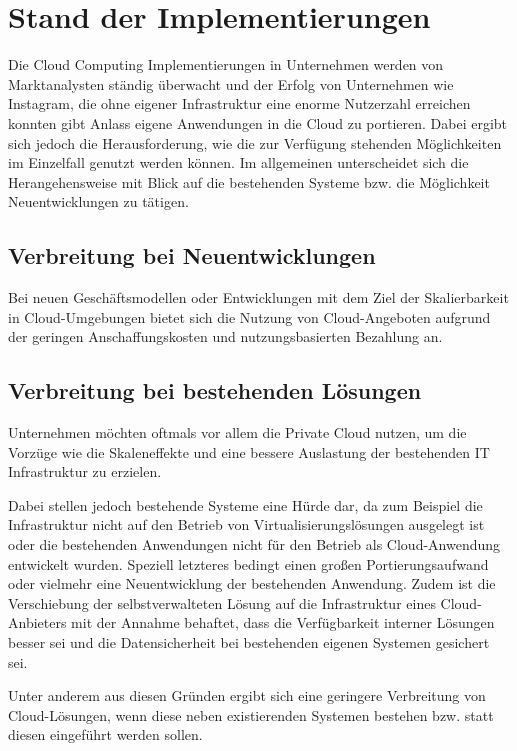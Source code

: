 \section{Stand der Implementierungen}
\label{sec_implementations}
Die Cloud Computing Implementierungen in Unternehmen werden von Marktanalysten ständig überwacht und der Erfolg von Unternehmen wie Instagram, die ohne eigener Infrastruktur eine enorme Nutzerzahl erreichen konnten gibt Anlass eigene Anwendungen in die Cloud zu portieren. Dabei ergibt sich jedoch die Herausforderung, wie die zur Verfügung stehenden Möglichkeiten im Einzelfall genutzt werden können. Im allgemeinen unterscheidet sich die Herangehensweise mit Blick auf die bestehenden Systeme bzw. die Möglichkeit Neuentwicklungen zu tätigen.

\subsection{Verbreitung bei Neuentwicklungen}
Bei neuen Geschäftsmodellen oder Entwicklungen mit dem Ziel der Skalierbarkeit in Cloud-Umgebungen bietet sich die Nutzung von Cloud-Angeboten aufgrund der geringen Anschaffungskosten und nutzungsbasierten Bezahlung an. \cite{gigaOm}

\subsection{Verbreitung bei bestehenden Lösungen}
Unternehmen möchten oftmals vor allem die Private Cloud nutzen, um die Vorzüge wie die Skaleneffekte und eine bessere Auslastung der bestehenden IT Infrastruktur zu erzielen. 

Dabei stellen jedoch bestehende Systeme eine Hürde dar, da zum Beispiel die Infrastruktur nicht auf den Betrieb von Virtualisierungslösungen ausgelegt ist oder die bestehenden Anwendungen nicht für den Betrieb als Cloud-Anwendung entwickelt wurden. Speziell letzteres bedingt einen großen Portierungsaufwand oder vielmehr eine Neuentwicklung der bestehenden Anwendung. Zudem ist die Verschiebung der selbstverwalteten Lösung auf die Infrastruktur eines Cloud-Anbieters mit der Annahme behaftet, dass die Verfügbarkeit interner Lösungen besser sei und die Datensicherheit bei bestehenden eigenen Systemen gesichert sei. \cite{gigaOm}

Unter anderem aus diesen Gründen ergibt sich eine geringere Verbreitung von Cloud-Lösungen, wenn diese neben existierenden Systemen bestehen bzw. statt diesen eingeführt werden sollen.

